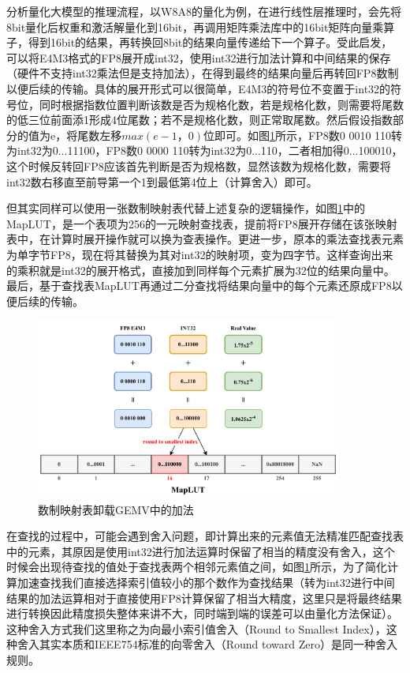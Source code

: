 分析量化大模型的推理流程，以W8A8的量化为例，在进行线性层推理时，会先将8bit量化后权重和激活解量化到16bit，再调用矩阵乘法库中的16bit矩阵向量乘算子，得到16bit的结果，再转换回8bit的结果向量传递给下一个算子。受此启发，
可以将E4M3格式的FP8展开成int32，使用int32进行加法计算和中间结果的保存（硬件不支持int32乘法但是支持加法），在得到最终的结果向量后再转回FP8数制以便后续的传输。具体的展开形式可以很简单，E4M3的符号位不变置于int32的符号位，同时根据指数位置判断该数是否为规格化数，若是规格化数，则需要将尾数的低三位前面添1形成4位尾数；若不是规格化数，则正常取尾数。然后假设指数部分的值为e，将尾数左移$max(e-1，0)$位即可。如图\ref{LUTBS}所示，FP8数0 0010 110转为int32为0...11100，FP8数0 0000 110转为int32为0...110，二者相加得0...100010，这个时候反转回FP8应该首先判断是否为规格数，显然该数为规格化数，需要将int32数右移直至前导第一个1到最低第4位上（计算舍入）即可。

但其实同样可以使用一张数制映射表代替上述复杂的逻辑操作，如图\ref{LUTBS}中的MapLUT，是一个表项为256的一元映射查找表，提前将FP8展开存储在该张映射表中，在计算时展开操作就可以换为查表操作。更进一步，原本的乘法查找表元素为单字节FP8，现在将其替换为其对int32的映射项，变为四字节。这样查询出来的乘积就是int32的展开格式，直接加到同样每个元素扩展为32位的结果向量中。最后，基于查找表MapLUT再通过二分查找将结果向量中的每个元素还原成FP8以便后续的传输。

\begin{figure}[!htbp]
	\centering
    \includegraphics[width=0.9\textwidth]{figures/BinarySearch.pdf}
	\caption{数制映射表卸载GEMV中的加法}
    \label{LUTBS}
\end{figure}

在查找的过程中，可能会遇到舍入问题，即计算出来的元素值无法精准匹配查找表中的元素，其原因是使用int32进行加法运算时保留了相当的精度没有舍入，这个时候会出现待查找的值处于查找表两个相邻元素值之间，如图\ref{LUTBS}所示，为了简化计算加速查找我们直接选择索引值较小的那个数作为查找结果（转为int32进行中间结果的加法运算相对于直接使用FP8计算保留了相当大精度，这里只是将最终结果进行转换因此精度损失整体来讲不大，同时端到端的误差可以由量化方法保证）。这种舍入方式我们这里称之为向最小索引值舍入（Round to Smallest Index），这种舍入其实本质和IEEE754标准的向零舍入（Round toward Zero）是同一种舍入规则。

